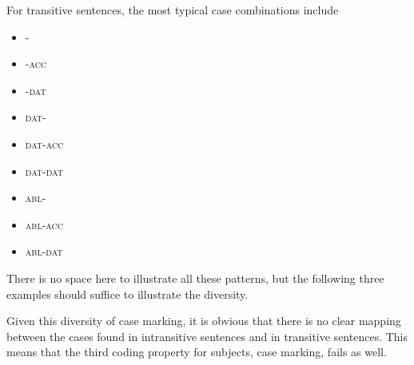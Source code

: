 \documentclass[a4paper]{article}
\begin{document}

For transitive sentences, the most typical case combinations include

\begin{itemize}
 \item \zero-\zero{}
 \item \zero{}-\textsc{acc}
 \item \zero{}-\textsc{dat}
 \item \textsc{dat}-\zero{}
 \item \textsc{dat}-\textsc{acc}
 \item \textsc{dat}-\textsc{dat}
 \item \textsc{abl}-\zero
 \item \textsc{abl}-\textsc{acc}
 \item \textsc{abl}-\textsc{dat}
\end{itemize}

There is no space here to illustrate all these patterns, but the following three examples should suffice to illustrate the diversity.








Given this diversity of case marking, it is obvious that there is no clear mapping between the cases found in intransitive sentences and in transitive sentences. This means that the third coding property for subjects, case marking, fails as well.
\end{document}
